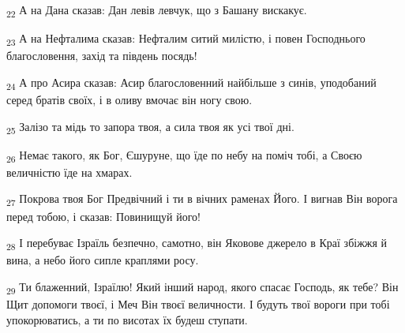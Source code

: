 \begin{tcolorbox}
\textsubscript{22} А на Дана сказав: Дан левів левчук, що з Башану вискакує.
\end{tcolorbox}
\begin{tcolorbox}
\textsubscript{23} А на Нефталима сказав: Нефталим ситий милістю, і повен Господнього благословення, захід та південь посядь!
\end{tcolorbox}
\begin{tcolorbox}
\textsubscript{24} А про Асира сказав: Асир благословенний найбільше з синів, уподобаний серед братів своїх, і в оливу вмочає він ногу свою.
\end{tcolorbox}
\begin{tcolorbox}
\textsubscript{25} Залізо та мідь то запора твоя, а сила твоя як усі твої дні.
\end{tcolorbox}
\begin{tcolorbox}
\textsubscript{26} Немає такого, як Бог, Єшуруне, що їде по небу на поміч тобі, а Своєю величністю їде на хмарах.
\end{tcolorbox}
\begin{tcolorbox}
\textsubscript{27} Покрова твоя Бог Предвічний і ти в вічних раменах Його. І вигнав Він ворога перед тобою, і сказав: Повинищуй його!
\end{tcolorbox}
\begin{tcolorbox}
\textsubscript{28} І перебуває Ізраїль безпечно, самотно, він Яковове джерело в Краї збіжжя й вина, а небо його сипле краплями росу.
\end{tcolorbox}
\begin{tcolorbox}
\textsubscript{29} Ти блаженний, Ізраїлю! Який інший народ, якого спасає Господь, як тебе? Він Щит допомоги твоєї, і Меч Він твоєї величности. І будуть твої вороги при тобі упокорюватись, а ти по висотах їх будеш ступати.
\end{tcolorbox}
